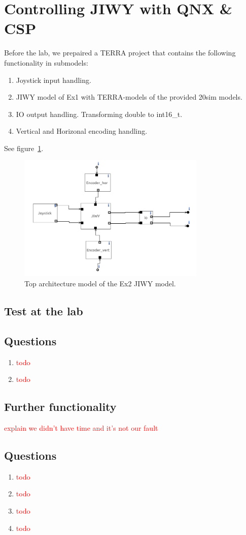\documentclass[a4paper,twoside,11pt]{article}
\newcommand{\todo}[1]{{\Large\sc\textcolor{red}{#1}}}
\begin{document}
\section{Controlling JIWY with QNX \& CSP}
Before the lab, we prepaired a TERRA project that contains the following functionality in submodels:
\begin{enumerate}
	\item Joystick input handling.
	\item JIWY model of Ex1 with TERRA-models of the provided 20sim models.
	\item IO output handling. Transforming double to int16\_t.
	\item Vertical and Horizonal encoding handling.
\end{enumerate}
See figure~\ref{fig:jiwy-overview}.
\begin{figure}
 \centering
 \includegraphics[width=0.8\textwidth]{./img/jiwy-overview.png}
 \caption{Top architecture model of the Ex2 JIWY model.}
 \label{fig:jiwy-overview}
\end{figure}
\subsection{Test at the lab}

\subsection{Questions}
\begin{enumerate}
 \item \todo{todo}
 \item \todo{todo}
\end{enumerate}

\subsection{Further functionality}
\todo{explain we didn't have time and it's not our fault}

\subsection{Questions}
\begin{enumerate}
 \item \todo{todo}
 \item \todo{todo}
 \item \todo{todo}
 \item \todo{todo}
\end{enumerate}
\end{document}
